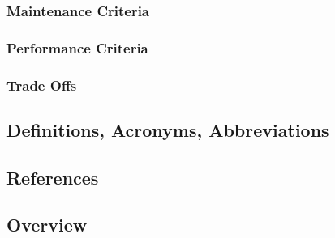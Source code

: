 \documentclass[12pt]{article} %
\begin{document}



\subsubsection{Maintenance Criteria} %


\subsubsection{Performance Criteria} %


\subsubsection{Trade Offs} %


\subsection{Definitions, Acronyms, Abbreviations} %


\subsection{References} %



\subsection{Overview} %

\end{document}
